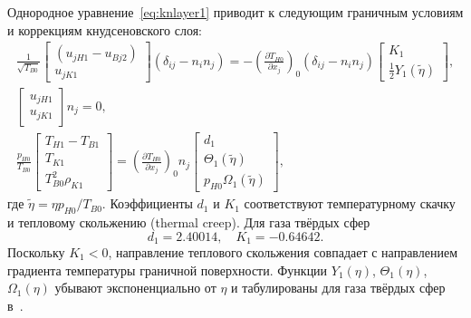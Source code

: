 \documentclass[
aps,%
12pt,%
final,%
notitlepage,%
oneside,%
onecolumn,%
nobibnotes,%
nofootinbib,%
superscriptaddress,%
noshowpacs,%
showkeys,%
floatfix,%
tightenlines,%
centertags]%
{revtex4}
\newcommand{\pder}[2][]{\frac{\partial#1}{\partial#2}}
\newcommand{\deltann}[2]{(\delta_{#1#2}-n_#1 n_#2)}
\newcommand{\onwall}[1]{\left(#1\right)_0}
\begin{document}
Однородное уравнение~\eqref{eq:knlayer1} приводит к следующим
граничным условиям и коррекциям кнудсеновского слоя:
\begin{gather}
    \frac1{\sqrt{T_{B0}}}\begin{bmatrix} (u_{jH1} - u_{Bj2}) \\ u_{jK1} \end{bmatrix} \deltann{i}{j} =
        - \onwall{\pder[T_{H0}]{x_j}} \deltann{i}{j}
        \begin{bmatrix} K_1 \\ \frac12 Y_1(\tilde\eta) \end{bmatrix}, \label{eq:boundary_u1t}\\
    \begin{bmatrix} u_{jH1} \\ u_{jK1} \end{bmatrix} n_j = 0, \label{eq:boundary_u1n}\\
    \frac{p_{H0}}{T_{B0}}\begin{bmatrix} T_{H1} - T_{B1} \\ T_{K1} \\ T_{B0}^2\rho_{K1} \end{bmatrix} =
        \onwall{\pder[T_{H0}]{x_j}} n_j
        \begin{bmatrix} d_1 \\ \Theta_1(\tilde\eta) \\ p_{H0}\Omega_1(\tilde\eta) \end{bmatrix}, \label{eq:boundary_T1}
\end{gather}
где \(\tilde\eta = \eta p_{H0}/T_{B0}\).
Коэффициенты \(d_1\) и \(K_1\) соответствуют температурному скачку и тепловому скольжению (thermal creep).
Для газа твёрдых сфер~\cite{Ohwada1989creep, Ohwada1989jump, Takata2015}
\begin{equation}\label{eq:slip_coeffs}
    d_1 = 2.40014, \quad K_1 = -0.64642.
\end{equation}
Поскольку \(K_1<0\), направление теплового скольжения совпадает
с направлением градиента температуры граничной поверхности.
Функции \(Y_1(\eta)\), \(\Theta_1(\eta)\), \(\Omega_1(\eta)\) убывают экспоненциально от \(\eta\)
и табулированы для газа твёрдых сфер в~\cite{Ohwada1989creep, Ohwada1989jump, Sone2002, Sone2007, Takata2015}.
\end{document}

